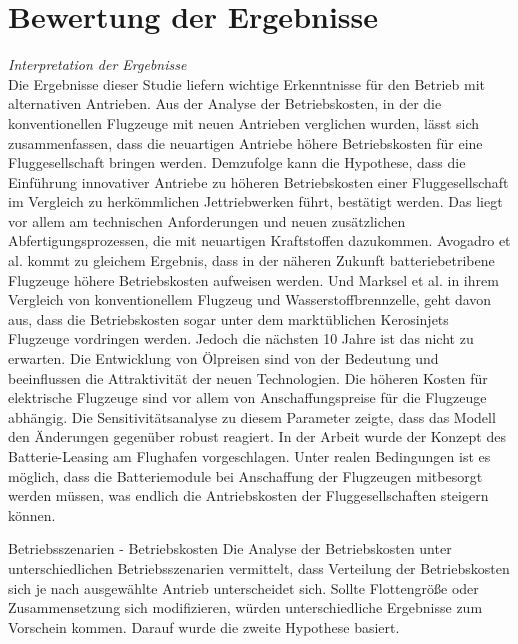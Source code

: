 
\section{Bewertung der Ergebnisse}
\label{s:Bewertung der Ergebnisse}

\textit{Interpretation der Ergebnisse}\\
Die Ergebnisse dieser Studie liefern wichtige Erkenntnisse für den Betrieb mit alternativen Antrieben.
Aus der Analyse der Betriebskosten, in der die konventionellen Flugzeuge mit neuen Antrieben verglichen wurden, 
lässt sich zusammenfassen, dass die neuartigen Antriebe höhere Betriebskosten für eine Fluggesellschaft bringen werden.
Demzufolge kann die Hypothese, dass die Einführung innovativer Antriebe zu höheren Betriebskosten einer Fluggesellschaft im Vergleich zu herkömmlichen
Jettriebwerken führt, bestätigt werden. Das liegt vor allem am technischen Anforderungen und neuen zusätzlichen Abfertigungsprozessen, die mit neuartigen
Kraftstoffen dazukommen. Avogadro et al.\cite{avogadro2024demystifying} kommt zu gleichem Ergebnis, 
dass in der näheren Zukunft batteriebetribene Flugzeuge höhere Betriebskosten aufweisen werden. Und Marksel et al. \cite{marksel2023comparative} in ihrem
Vergleich von konventionellem Flugzeug und Wasserstoffbrennzelle, geht davon aus, dass die Betriebskosten sogar unter dem marktüblichen Kerosinjets
Flugzeuge vordringen werden. Jedoch die nächsten 10 Jahre ist das nicht zu erwarten. 
Die Entwicklung von Ölpreisen sind von der Bedeutung und beeinflussen
die Attraktivität der neuen Technologien.
%
Die höheren Kosten für elektrische Flugzeuge sind vor allem von Anschaffungspreise für
die Flugzeuge abhängig. Die Sensitivitätsanalyse zu diesem Parameter zeigte, dass das Modell den Änderungen gegenüber robust reagiert.
In der Arbeit wurde der Konzept des Batterie-Leasing am Flughafen vorgeschlagen. Unter realen Bedingungen ist es möglich, 
dass die Batteriemodule bei Anschaffung der Flugzeugen mitbesorgt werden müssen, was endlich die Antriebskosten der Fluggesellschaften steigern
können. 


Betriebsszenarien - Betriebskosten
Die Analyse der Betriebskosten unter unterschiedlichen Betriebsszenarien vermittelt, dass Verteilung der Betriebskosten sich je nach
ausgewählte Antrieb unterscheidet sich. Sollte Flottengröße oder Zusammensetzung sich modifizieren, würden unterschiedliche Ergebnisse zum Vorschein kommen.
Darauf wurde die zweite Hypothese basiert. 

